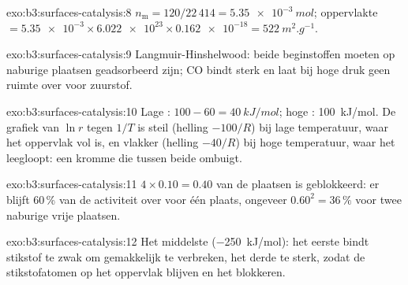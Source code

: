 \begin{solution}{exo:b3:surfaces-catalysis:8}
$n_{\mathrm m} = 120/22\,414 = \qty{5.35e-3}{mol}$; oppervlakte $= \num{5.35e-3} \times \num{6.022e23} \times \num{0.162e-18} =
\qty{522}{m^2.g^{-1}}$.
\end{solution}

\begin{solution}{exo:b3:surfaces-catalysis:9}
Langmuir-Hinshelwood: beide beginstoffen moeten op naburige plaatsen
geadsorbeerd zijn; CO bindt sterk en laat bij hoge druk geen ruimte over
voor zuurstof.
\end{solution}

\begin{solution}{exo:b3:surfaces-catalysis:10}
Lage : $100 - 60 = \qty{40}{kJ/mol}$; hoge : \qty{100}{kJ/mol}. De grafiek van $\ln r$
tegen $1/T$ is steil (helling $-100/R$) bij lage temperatuur, waar het
oppervlak vol is, en vlakker (helling $-40/R$) bij hoge temperatuur, waar het leegloopt: een kromme
die tussen beide ombuigt.
\end{solution}

\begin{solution}{exo:b3:surfaces-catalysis:11}
$4 \times 0.10 = 0.40$ van de plaatsen is geblokkeerd: er blijft 60\,\% van de
activiteit over voor één plaats, ongeveer $0.60^2 = 36\,\%$ voor twee naburige vrije
plaatsen.
\end{solution}

\begin{solution}{exo:b3:surfaces-catalysis:12}
Het middelste (\qty{-250}{kJ/mol}): het eerste bindt stikstof te zwak om 
gemakkelijk te verbreken, het derde te sterk, zodat de stikstofatomen op
het oppervlak blijven en het blokkeren.
\end{solution}

